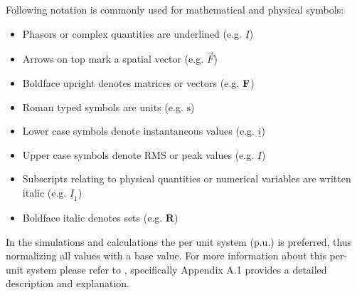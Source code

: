 Following notation is commonly used for mathematical and physical symbols:
\begin{itemize}[noitemsep]
    \item Phasors or complex quantities are underlined (e.g. $\underline{I}$)
    \item Arrows on top mark a spatial vector (e.g. $\overrightarrow{F}$)
    \item Boldface upright denotes matrices or vectors (e.g. $\mathrm{\textbf{F}}$)
    \item Roman typed symbols are units (e.g. $\mathrm{s}$)
    \item Lower case symbols denote instantaneous values (e.g. $\underline{i}$)
    \item Upper case symbols denote \acs{RMS} or peak values (e.g. $\underline{I}$)
    \item Subscripts relating to physical quantities or numerical variables are written italic (e.g. $\underline{I}_1$) 
    \item Boldface italic denotes sets (e.g. $\boldsymbol{R}$)
\end{itemize}

In the simulations and calculations the per unit system ($\mathrm{p.u.}$) is preferred, thus normalizing all values with a base value. 
For more information about this per-unit system please refer to \textcite{machowski_2020}, specifically Appendix A.1 provides a detailed description and explanation.